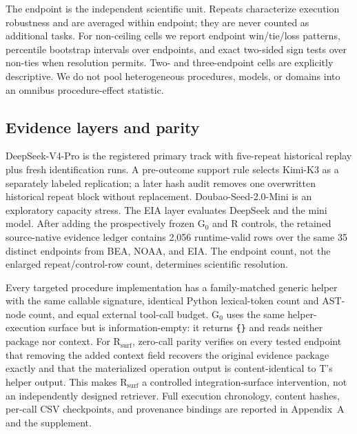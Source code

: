 The endpoint is the independent scientific unit. Repeats characterize execution robustness and are averaged within endpoint; they are never counted as additional tasks. For non-ceiling cells we report endpoint win/tie/loss patterns, percentile bootstrap intervals over endpoints, and exact two-sided sign tests over non-ties when resolution permits. Two- and three-endpoint cells are explicitly descriptive. We do not pool heterogeneous procedures, models, or domains into an omnibus procedure-effect statistic.

\subsection{Evidence layers and parity}
DeepSeek-V4-Pro is the registered primary track with five-repeat historical replay plus fresh identification runs. A pre-outcome support rule selects Kimi-K3 as a separately labeled replication; a later hash audit removes one overwritten historical repeat block without replacement. Doubao-Seed-2.0-Mini is an exploratory capacity stress. The EIA layer evaluates DeepSeek and the mini model. After adding the prospectively frozen G$_0$ and R controls, the retained source-native evidence ledger contains 2,056 runtime-valid rows over the same 35 distinct endpoints from BEA, NOAA, and EIA. The endpoint count, not the enlarged repeat/control-row count, determines scientific resolution.

Every targeted procedure implementation has a family-matched generic helper with the same callable signature, identical Python lexical-token count and AST-node count, and equal external tool-call budget. G$_0$ uses the same helper-execution surface but is information-empty: it returns \texttt{\{\}} and reads neither package nor context. For R$_{\mathrm{surf}}$, zero-call parity verifies on every tested endpoint that removing the added context field recovers the original evidence package exactly and that the materialized operation output is content-identical to T's helper output. This makes R$_{\mathrm{surf}}$ a controlled integration-surface intervention, not an independently designed retriever. Full execution chronology, content hashes, per-call CSV checkpoints, and provenance bindings are reported in Appendix~A and the supplement.
